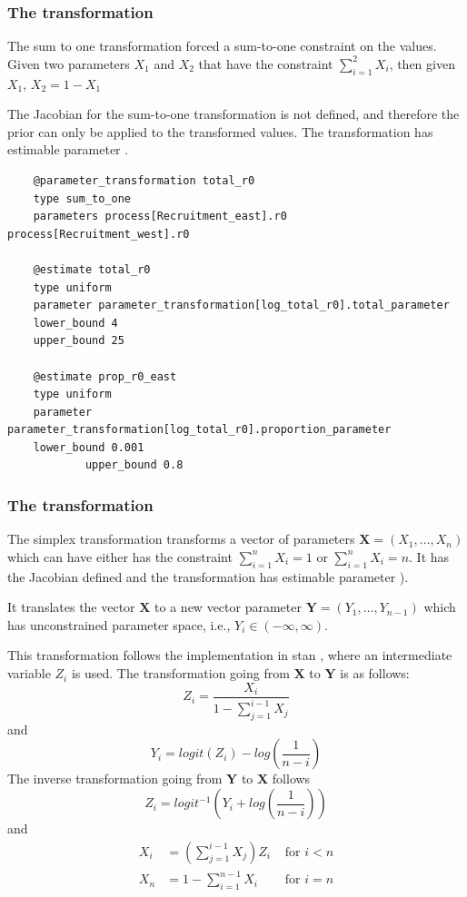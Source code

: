 \subsubsection{The  transformation} \label{sec:Transformation-SumToOne}

The sum to one transformation forced a sum-to-one constraint on the values. Given two parameters $X_1$ and $X_2$ that have the constraint $\sum_{i = 1}^2X_i$, then given $X_1$, $X_2 = 1 - X_1$

The Jacobian for the sum-to-one transformation is not defined, and therefore the prior can only be applied to the transformed values. The transformation has estimable parameter .

{\small{\begin{verbatim}
	@parameter_transformation total_r0
	type sum_to_one
	parameters process[Recruitment_east].r0 process[Recruitment_west].r0
	
	@estimate total_r0
	type uniform
	parameter parameter_transformation[log_total_r0].total_parameter
	lower_bound 4
	upper_bound 25
	
	@estimate prop_r0_east
	type uniform
	parameter parameter_transformation[log_total_r0].proportion_parameter
	lower_bound 0.001
			upper_bound 0.8		
\end{verbatim}}}

\subsubsection{The  transformation} \label{sec:Transformation-Simplex}


The simplex transformation transforms a vector of parameters $\mathbf{X} = (X_1, \dots, X_n)$ which can have either has the constraint $\sum_{i = 1}^n X_i = 1$ or $\sum_{i = 1}^n X_i = n$. It has the Jacobian defined and the transformation has estimable parameter ).

It translates the vector $\mathbf{X}$ to a new vector parameter \(\mathbf{Y} = (Y_1, \dots, Y_{n - 1})\) which has unconstrained parameter space, i.e., \(Y_i \in (-\infty, \infty)\). 

This transformation follows the implementation in stan \citep{STAN}, where an intermediate variable \(Z_i\) is used. The transformation going from $\mathbf{X}$ to $\mathbf{Y}$ is as follows:\\
\[Z_i = \frac{X_i}{1 - \sum_{j = 1}^{i - 1}X_j}\]
and 
\[Y_i = logit(Z_i) - log\left(\frac{1}{n -i}\right)\]
The inverse transformation going from $\mathbf{Y}$ to $\mathbf{X}$ follows
\[Z_i = logit^{-1}\left(Y_i +  log\left(\frac{1}{n -i}\right)\right)\]
and
\begin{align*}
	X_i &= \left( \sum_{j = 1}^{i - 1}X_j\right)Z_i & \text{ for } i < n\\
	X_n &= 1 - \sum_{i = 1}^{n - 1} X_i & \text{ for } i = n
\end{align*}

